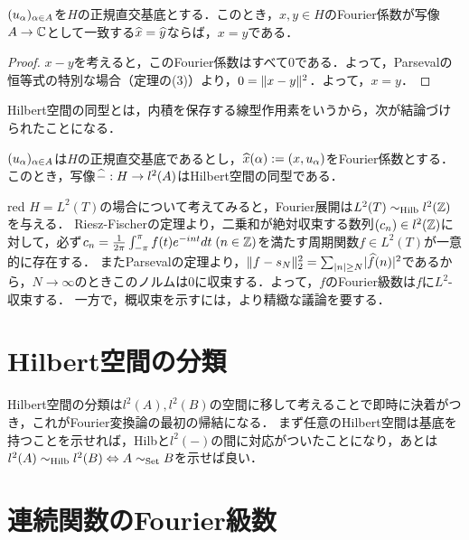 \documentclass[uplatex,dvipdfmx]{jsreport}
\begin{document}
\begin{corollary}
    $(u_\alpha)_{\alpha\in A}$を$H$の正規直交基底とする．このとき，$x,y\in H$のFourier係数が写像$A\to\mathbb{C}$として一致する$\widehat{x}=\widehat{y}$ならば，$x=y$である．
\end{corollary}
\begin{proof}
    $x-y$を考えると，このFourier係数はすべて$0$である．よって，Parsevalの恒等式の特別な場合（定理の(3)）より，$0=\|x-y\|^2$．よって，$x=y$．
\end{proof}

Hilbert空間の同型とは，内積を保存する線型作用素をいうから，次が結論づけられたことになる．

\begin{corollary}
    $(u_\alpha)_{\alpha\in A}$は$H$の正規直交基底であるとし，$\widehat{x}(\alpha):=(x,u_\alpha)$をFourier係数とする．
    このとき，写像$\widehat{-}:H\to l^2(A)$はHilbert空間の同型である．
\end{corollary}

\begin{tbox}{red}{}
    $H=L^2(T)$の場合について考えてみると，Fourier展開は$L^2(T)\sim_{\mathrm{Hilb}} l^2(\mathbb{Z})$を与える．
    Riesz-Fischerの定理より，二乗和が絶対収束する数列$(c_n)\in l^2(\mathbb{Z})$に対して，必ず$c_n=\frac{1}{2\pi}\int^\pi_{-\pi}f(t)e^{-int}dt\;(n\in\mathbb{Z})$を満たす周期関数$f\in L^2(T)$が一意的に存在する．
    またParsevalの定理より，$\|f-s_N\|^2_2=\sum_{\lvert n\rvert\ge N}\lvert\widehat{f}(n)\rvert^2$であるから，$N\to\infty$のときこのノルムは$0$に収束する．よって，$f$のFourier級数は$f$に$L^2$-収束する．
    一方で，概収束を示すには，より精緻な議論を要する．
\end{tbox}

\section{Hilbert空間の分類}

\begin{tcolorbox}[colframe=ForestGreen, colback=ForestGreen!10!white,breakable,colbacktitle=ForestGreen!40!white,coltitle=black,fonttitle=\bfseries\sffamily,
title=]
    Hilbert空間の分類は$l^2(A),l^2(B)$の空間に移して考えることで即時に決着がつき，これがFourier変換論の最初の帰結になる．
    まず任意のHilbert空間は基底を持つことを示せれば，Hilbと$l^2(-)$の間に対応がついたことになり，あとは$l^2(A)\sim_{\mathrm{Hilb}} l^2(B)\Leftrightarrow A\sim_{\mathrm{Set}} B$を示せば良い．
\end{tcolorbox}

\section{連続関数のFourier級数}
\end{document}
